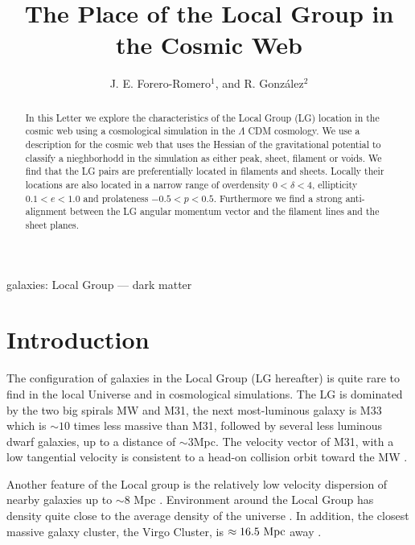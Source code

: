 \documentclass{emulateapj}
\newcommand{\mpc}{\rm{Mpc}}
\begin{document}
\title{The Place of the Local Group in the Cosmic Web}
\author{J. E. Forero-Romero$^1$, and R. Gonz\'alez$^2$}


\begin{abstract}
In this Letter we explore the characteristics of the Local Group (LG)
location in the cosmic web using a cosmological simulation in the
$\Lambda$ CDM cosmology.
We use a description for the cosmic web that uses the Hessian of the
gravitational potential to classify a nieghborhodd in the simulation
as either peak, sheet, filament or voids. We find that the LG pairs
are preferentially located in filaments and sheets. Locally their
locations are also located in a narrow range of overdensity
$0<\delta<4$, ellipticity $0.1<e<1.0$ and prolateness
$-0.5<p<0.5$. Furthermore we find a strong anti-alignment between the
LG angular momentum vector and the filament lines and the sheet 
planes.  
\end{abstract}

\begin{keywords}
{galaxies: Local Group --- dark matter}
\end{keywords}


\section{Introduction}
\label{sec:intro}

The configuration of galaxies in the Local Group (LG hereafter) is
quite rare to find in the local Universe and in cosmological
simulations. The LG is dominated by the two big spirals MW and M31, the next
most-luminous galaxy is M33 which is $\sim 10$ times less massive than
M31, followed by several less luminous dwarf galaxies, up to a
distance of $\sim 3$\mpc.   The velocity vector of M31, with a low
tangential velocity is consistent to a head-on collision orbit toward
the MW
\citep{2008MNRAS.386..461C,2012ApJ...753....8V,2012ApJ...753....7S}.   

Another feature of the Local group is the relatively low velocity
dispersion of nearby galaxies up to $\sim 8$ Mpc \citep[][and
  references therein]{1975ApJ...196..313S,2011MNRAS.415L..16A}. 
Environment around the Local Group has density quite close to the
average density of the universe
\citep{2003ApJ...596...19K,2005AJ....129..178K}. In addition, the
closest massive galaxy cluster, the Virgo Cluster, is $\approx
16.5\ \mpc$ away \citep{2007ApJ...655..144M}.  
\end{document}
